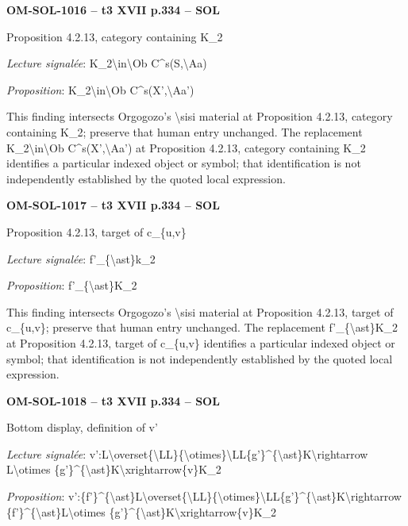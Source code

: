 \par\noindent\textbf{OM-SOL-1016 -- t3 XVII p.334 -- SOL}\par
Proposition 4.2.13, category containing K\_2\par
\emph{Lecture signalée}: K\_2\textbackslash{}in\textbackslash{}Ob C\textasciicircum{}s(S,\textbackslash{}Aa)\par
\emph{Proposition}: K\_2\textbackslash{}in\textbackslash{}Ob C\textasciicircum{}s(X',\textbackslash{}Aa')\par
This finding intersects Orgogozo's \textbackslash{}sisi material at Proposition 4.2.13, category containing K\_2; preserve that human entry unchanged. The replacement K\_2\textbackslash{}in\textbackslash{}Ob C\textasciicircum{}s(X',\textbackslash{}Aa') at Proposition 4.2.13, category containing K\_2 identifies a particular indexed object or symbol; that identification is not independently established by the quoted local expression.\par
\par\noindent\textbf{OM-SOL-1017 -- t3 XVII p.334 -- SOL}\par
Proposition 4.2.13, target of c\_\{u,v\}\par
\emph{Lecture signalée}: f'\_\{\textbackslash{}ast\}k\_2\par
\emph{Proposition}: f'\_\{\textbackslash{}ast\}K\_2\par
This finding intersects Orgogozo's \textbackslash{}sisi material at Proposition 4.2.13, target of c\_\{u,v\}; preserve that human entry unchanged. The replacement f'\_\{\textbackslash{}ast\}K\_2 at Proposition 4.2.13, target of c\_\{u,v\} identifies a particular indexed object or symbol; that identification is not independently established by the quoted local expression.\par
\par\noindent\textbf{OM-SOL-1018 -- t3 XVII p.334 -- SOL}\par
Bottom display, definition of v'\par
\emph{Lecture signalée}: v':L\textbackslash{}overset\{\textbackslash{}LL\}\{\textbackslash{}otimes\}\textbackslash{}LL\{g'\}\textasciicircum{}\{\textbackslash{}ast\}K\textbackslash{}rightarrow L\textbackslash{}otimes \{g'\}\textasciicircum{}\{\textbackslash{}ast\}K\textbackslash{}xrightarrow\{v\}K\_2\par
\emph{Proposition}: v':\{f'\}\textasciicircum{}\{\textbackslash{}ast\}L\textbackslash{}overset\{\textbackslash{}LL\}\{\textbackslash{}otimes\}\textbackslash{}LL\{g'\}\textasciicircum{}\{\textbackslash{}ast\}K\textbackslash{}rightarrow \{f'\}\textasciicircum{}\{\textbackslash{}ast\}L\textbackslash{}otimes \{g'\}\textasciicircum{}\{\textbackslash{}ast\}K\textbackslash{}xrightarrow\{v\}K\_2\par
